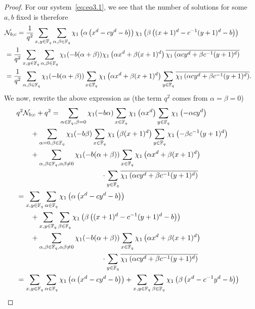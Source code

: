 \documentclass[11pt]{article}
\def\cN{{\mathcal N}}
\def\F{{\mathbb F}}
\def\\{\cr}
\begin{document}
\begin{proof}
For our system~\eqref{eq:eq3.1}, we see that the number of solutions for some $a,b$ fixed is therefore
\allowdisplaybreaks
\begin{align*}
&\cN_{b;c}
=\frac{1}{q^2}\sum_{x,y\in \F_q}\sum_{\alpha,\beta\in\F_q} \chi_1\left(\alpha\left(x^d-cy^d-b \right) \right) \chi_1\left(\beta\left((x+1)^d-c^{-1} (y+1)^d-b \right) \right)\\
&=\frac{1}{q^2}\sum_{x,y\in \F_q}\sum_{\alpha,\beta\in\F_q} \chi_1(-b(\alpha+\beta)) \chi_1\left(\alpha x^d+\beta(x+1)^d\right) \overline{ \chi_1\left(\alpha cy^d+ \beta c^{-1} (y+1)^d  \right)}\\
&= \frac{1}{q^2}\sum_{\alpha,\beta\in\F_q} \chi_1(-b(\alpha+\beta))
\sum_{x\in \F_q}
\chi_1\left(\alpha x^d+\beta(x+1)^d\right) \sum_{y\in \F_q} \overline{ \chi_1\left(\alpha cy^d+ \beta c^{-1} (y+1)^d  \right)}.
\end{align*}
We now, rewrite the above expression as (the term $q^2$ comes from $\alpha=\beta=0$)
\allowdisplaybreaks
\begin{align*}
&q^2\cN_{b;c}+q^2= \sum_{\alpha\in\F_q,\beta=0} \chi_1(-b \alpha)\sum_{x\in \F_q}
\chi_1\left(\alpha x^d\right) \sum_{y\in \F_q}   \chi_1\left(-\alpha cy^d \right)\\
&\qquad +\sum_{\alpha=0,\beta\in\F_q} \chi_1(-b \beta)
\sum_{x\in \F_q}
\chi_1\left(\beta(x+1)^d\right) \sum_{y\in \F_q}  \chi_1\left(-\beta c^{-1} (y+1)^d  \right)\\
&\qquad +\sum_{\alpha,\beta\in\F_q,\alpha\beta\neq 0} \chi_1(-b(\alpha+\beta))
\sum_{x\in \F_q}
\chi_1\left(\alpha x^d+\beta(x+1)^d\right) \\
&\qquad\qquad\qquad\qquad\qquad\qquad\cdot  \sum_{y\in \F_q} \overline{ \chi_1\left(\alpha cy^d+ \beta c^{-1} (y+1)^d  \right)}\\
&=\sum_{x,y\in \F_q} \sum_{\alpha\in\F_q}\chi_1\left(\alpha\left( x^d-cy^d-b  \right) \right)\\
&\qquad +\sum_{x,y\in \F_q} \sum_{\beta\in\F_q}\chi_1\left(\beta\left( (x+1)^d-c^{-1}(y+1)^d-b  \right) \right)\\ 
&\qquad +\sum_{\alpha,\beta\in\F_q,\alpha\beta\neq 0} \chi_1(-b(\alpha+\beta))
\sum_{x\in \F_q}
\chi_1\left(\alpha x^d+\beta(x+1)^d\right)\\
&\qquad\qquad\qquad\qquad\qquad\qquad\cdot  \sum_{y\in \F_q} \overline{ \chi_1\left(\alpha cy^d+ \beta c^{-1} (y+1)^d  \right)}\\
&=\sum_{x,y\in \F_q} \sum_{\alpha\in\F_q}\chi_1\left(\alpha\left( x^d-cy^d-b  \right) \right)+\sum_{x,y\in \F_q} \sum_{\beta\in\F_q}\chi_1\left(\beta\left( x^d-c^{-1}y^d-b  \right) \right)\\ 

\end{align*}
\end{proof}
\end{document}
